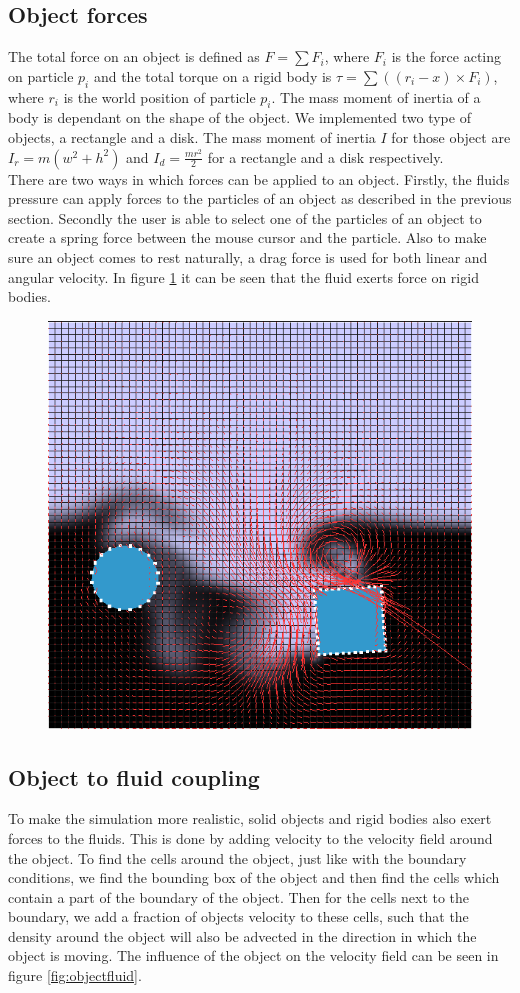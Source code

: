 \subsection{Object forces}
The total force on an object is defined as $F = \sum{F_i}$, where $F_i$ is the force acting on particle $p_i$ and the total torque on a rigid body is $\tau = \sum{((r_i - x) \times F_i)}$, where $r_i$ is the world position of particle $p_i$. The mass moment of inertia of a body is dependant on the shape of the object. We implemented two type of objects, a rectangle and a disk. The mass moment of inertia $I$ for those object are $I_r =  m (w^2 + h^2)$ and $I_d = \frac{mr^2}{2}$ for a rectangle and a disk respectively.\\
There are two ways in which forces can be applied to an object. Firstly, the fluids pressure can apply forces to the particles of an object as described in the previous section. Secondly the user is able to select one of the particles of an object to create a spring force between the mouse cursor and the particle. Also to make sure an object comes to rest naturally, a drag force is used for both linear and angular velocity. In figure \ref{fig:fluidobject} it can be seen that the fluid exerts force on rigid bodies.
\begin{figure}[!htb]
\centering
  \includegraphics[height=0.5\textwidth]{img/fluidobject}
  \label{fig:fluidobject}
\end{figure}
\subsection{Object to fluid coupling}
To make the simulation more realistic, solid objects and rigid bodies also exert forces to the fluids. This is done by adding velocity to the velocity field around the object. To find the cells around the object, just like with the boundary conditions, we find the bounding box of the object and then find the cells which contain a part of the boundary of the object. Then for the cells next to the boundary, we add a fraction of objects velocity to these cells, such that the density around the object will also be advected in the direction in which the object is moving. The influence of the object on the velocity field can be seen in figure \ref{fig:objectfluid}.


